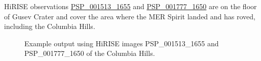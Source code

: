 
\ac{HiRISE} observations
\href{http://hirise.lpl.arizona.edu/PSP_001513_1655}{PSP\_001513\_1655} and
\href{http://hirise.lpl.arizona.edu/PSP_001777_1650}{PSP\_001777\_1650}
are on the floor of Gusev Crater and cover the area where the \ac{MER}
Spirit landed and has roved, including the Columbia Hills.

\begin{figure}[h!]
\centering
  \hfil
\caption{Example output using HiRISE images PSP\_001513\_1655 and
  PSP\_001777\_1650 of the Columbia Hills.}
\label{fig:hirise_chills_example}
\end{figure}

